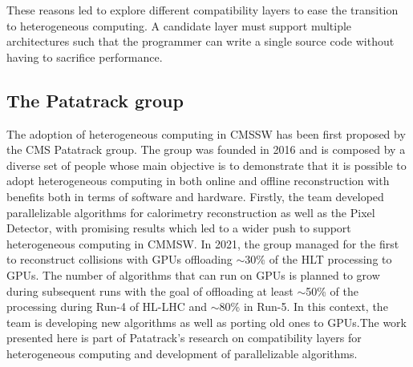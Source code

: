 These reasons led to explore different compatibility layers to ease the transition to heterogeneous computing. A candidate layer must support multiple architectures such that the programmer can write a single source code without having to sacrifice performance. 

\subsection{The Patatrack group}
The adoption of heterogeneous computing in CMSSW has been first proposed by the CMS Patatrack group. The group was founded in 2016 and is composed by a diverse set of people whose main objective is to demonstrate that it is possible to adopt heterogeneous computing in both online and offline reconstruction with benefits both in terms of software and hardware. Firstly, the team developed parallelizable algorithms for calorimetry reconstruction as well as the Pixel Detector\cite{pixeltrack}, with promising results which led to a wider push to support heterogeneous computing in CMMSW. In 2021, the group managed for the first to reconstruct collisions with GPUs\cite{HLT_GPUs} offloading $\sim$30\% of the HLT processing to GPUs. The number of algorithms that can run on GPUs is planned to grow during subsequent runs with the goal of offloading at least $\sim$50\% of the processing during Run-4 of HL-LHC and $\sim$80\% in Run-5. In this context, the team is developing new algorithms as well as porting old ones to GPUs.The work presented here is part of Patatrack's research on compatibility layers for heterogeneous computing and development of parallelizable algorithms.

